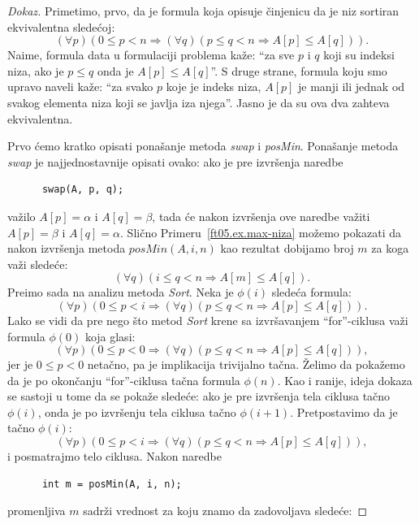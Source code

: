 \begin{proof}[Dokaz]
  Primetimo, prvo, da je formula koja opisuje \v cinjenicu da je niz sortiran ekvivalentna slede\'coj:
  $$
    (\forall p)(0 \le p < n \Rightarrow (\forall q)(p \le q < n \Rightarrow A[p] \le A[q])).
  $$
  Naime, formula data u formulaciji problema ka\v ze: \enquote{za sve $p$ i $q$ koji su indeksi niza, ako je $p \le q$ onda je $A[p] \le A[q]$}.
  S druge strane, formula koju smo upravo naveli ka\v ze: \enquote{za svako $p$ koje je indeks niza, $A[p]$ je manji ili jednak od svakog elementa
  niza koji se javlja iza njega}. Jasno je da su ova dva zahteva ekvivalentna.

  Prvo \'cemo kratko opisati pona\v sanje metoda \textit{swap} i \textit{posMin}. Pona\v sanje metoda \textit{swap} je
  najjednostavnije opisati ovako: ako je pre izvr\v senja naredbe
{\small
\begin{verbatim}
      swap(A, p, q);
\end{verbatim}
}
  \noindent
  va\v zilo $A[p] = \alpha$ i $A[q] = \beta$, tada \'ce nakon izvr\v senja ove naredbe va\v ziti
  $A[p] = \beta$ i $A[q] = \alpha$.
  Sli\v cno Primeru~\ref{ft05.ex.max-niza} mo\v zemo pokazati da nakon izvr\v senja metoda $\mathit{posMin}(A, i, n)$
  kao rezultat dobijamo broj $m$ za koga va\v zi slede\'ce:
  $$
    (\forall q)(i \le q < n \Rightarrow A[m] \le A[q]).
  $$
  Pre\dj imo sada na analizu metoda \textit{Sort}. Neka je $\phi(i)$ slede\'ca formula:
  $$
    (\forall p)(0 \le p < i \Rightarrow (\forall q)(p \le q < n \Rightarrow A[p] \le A[q])).
  $$
  Lako se vidi da pre nego \v sto metod \textit{Sort} krene sa izvr\v savanjem \enquote{for}-ciklusa
  va\v zi formula $\phi(0)$ koja glasi:
  $$
    (\forall p)(0 \le p < 0 \Rightarrow (\forall q)(p \le q < n \Rightarrow A[p] \le A[q])),
  $$
  jer je $0 \le p < 0$ neta\v cno, pa je implikacija trivijalno ta\v cna.
  \v Zelimo da poka\v zemo da je po okon\v canju \enquote{for}-ciklusa ta\v cna formula $\phi(n)$. Kao i ranije,
  ideja dokaza se sastoji u tome da se poka\v ze slede\'ce: ako je pre izvr\v senja tela ciklusa ta\v cno $\phi(i)$,
  onda je po izvr\v senju tela ciklusa ta\v cno $\phi(i + 1)$. Pretpostavimo da je ta\v cno $\phi(i)$:
  $$
    (\forall p)(0 \le p < i \Rightarrow (\forall q)(p \le q < n \Rightarrow A[p] \le A[q])),
  $$
  i posmatrajmo telo ciklusa. Nakon naredbe
{\small
\begin{verbatim}
      int m = posMin(A, i, n);
\end{verbatim}
}
\noindent
  promenljiva $m$ sadr\v zi vrednost za koju znamo da zadovoljava slede\'ce:

\end{proof}

